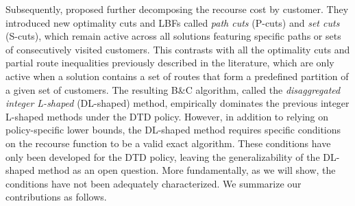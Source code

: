 \documentclass{article}
\begin{document}
Subsequently, \cite{parada2024disaggregated} proposed further decomposing the recourse cost by customer. They introduced new optimality cuts and LBFs called \textit{path cuts} (P-cuts) and \textit{set cuts} (S-cuts), which remain active across all solutions featuring specific paths or sets of consecutively visited customers. This contrasts with all the optimality cuts and partial route inequalities previously described in the literature, which are only active when a solution contains a set of routes that form a predefined partition of a given set of customers. The resulting B\&C algorithm, called the \textit{disaggregated integer L-shaped} (DL-shaped) method, empirically dominates the previous integer L-shaped methods under the DTD policy. However, in addition to relying on policy-specific lower bounds, the DL-shaped method requires specific conditions on the recourse function to be a valid exact algorithm. These conditions have only been developed for the DTD policy, leaving the generalizability of the DL-shaped method as an open question. More fundamentally, as we will show, the conditions have not been adequately characterized. We summarize our contributions as follows.
\end{document}
